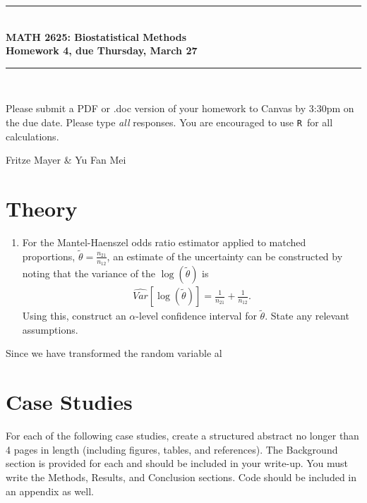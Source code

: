 \documentclass{article}
\newcommand{\HRule}{\rule{\linewidth}{0.5mm}}
\newcommand{\R}{\texttt{R}}
\begin{document}
	\begin{center}
		\HRule \\[0.1cm]
		\vspace{0.1cm}
		{ \LARGE \bfseries MATH 2625: Biostatistical Methods\\[0.5cm] Homework 4, due Thursday, March 27 } \\[0.1cm]
		\HRule \\[0.1cm]
	\end{center}
	
		Please submit a PDF or .doc version of your homework to Canvas by 3:30pm on the due date. Please type \emph{all} responses. You are encouraged to use \R\ for all calculations.

		Fritze Mayer \& Yu Fan Mei
		
	\section*{Theory}
	\begin{enumerate}
		\item For the Mantel-Haenszel odds ratio estimator applied to matched proportions, $\tilde{\theta} = \frac{n_{21}}{n_{12}}$, an estimate of the uncertainty can be constructed by noting that the variance of the $\log(\tilde{\theta})$ is
		\begin{align*}
			\widehat{Var}\left[\log(\tilde{\theta})\right] = \frac{1}{n_{21}} + \frac{1}{n_{12}}.
		\end{align*}
		Using this, construct an $\alpha$-level confidence interval for $\tilde{\theta}$. State any relevant assumptions.
	\end{enumerate}

	Since we have transformed the random variable al

	\section*{Case Studies}
	For each of the following case studies, create a structured abstract no longer than 4 pages in length (including figures, tables, and references). The Background section is provided for each and should be included in your write-up. You must write the Methods, Results, and Conclusion sections. Code should be included in an appendix as well.
\end{document}
